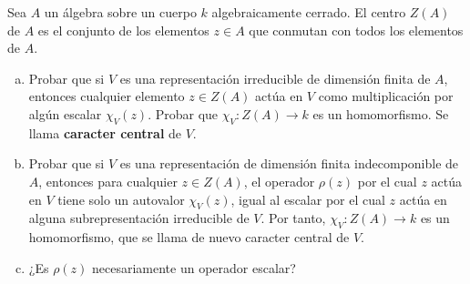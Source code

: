 \documentclass[twoside]{article}
\begin{document}
\begin{ejercicio}{1.21}
Sea $A$ un álgebra sobre un cuerpo $k$ algebraicamente cerrado. El centro $Z(A)$ de $A$ es el conjunto de los elementos $z\in A$ que conmutan con todos los elementos de $A$. 
\begin{enumerate}[(a)]
\item  Probar que si $V$ es una representación irreducible de dimensión finita de $A$, entonces cualquier elemento $z\in Z(A)$ actúa en $V$ como multiplicación por algún escalar $\chi_V(z)$. Probar que $\chi_V:Z(A)\to k$ es un homomorfismo. Se llama \textbf{caracter central} de $V$.

\item Probar que si $V$ es una representación de dimensión finita indecomponible de $A$, entonces para cualquier $z\in Z(A)$, el operador $\rho(z)$ por el cual $z$ actúa en $V$ tiene solo un autovalor $\chi_V(z)$, igual al escalar por el cual $z$ actúa en alguna subrepresentación irreducible de $V$. Por tanto, $\chi_V:Z(A)\to k$ es un homomorfismo, que se llama de nuevo caracter central de $V$.

\item ¿Es $\rho(z)$ necesariamente un operador escalar?

\end{enumerate}
\end{ejercicio}
\end{document}
